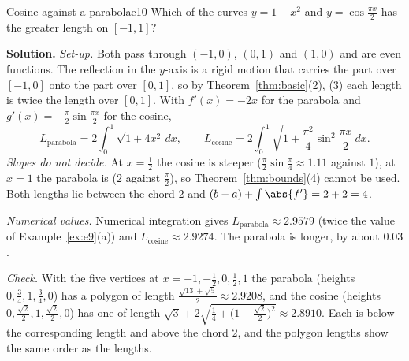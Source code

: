 \documentclass[11pt]{article}
\begin{document}
\begin{exmp}{Cosine against a parabola}{e10}
Which of the curves $y=1-x^2$ and $y=\cos\frac{\pi x}2$ has the greater length on $[-1,1]$?

\textbf{Solution.} \emph{Set-up.} Both pass through $(-1,0)$, $(0,1)$ and $(1,0)$ and are even functions. The reflection in the $y$-axis is a rigid motion that carries the part over $[-1,0]$ onto the part over $[0,1]$, so by Theorem~\ref{thm:basic}(2), (3) each length is twice the length over $[0,1]$. With $f'(x)=-2x$ for the parabola and $g'(x)=-\frac\pi2\sin\frac{\pi x}2$ for the cosine,
\[
L_{\text{parabola}}=2\int_0^1\sqrt{1+4x^2}\,dx,\qquad L_{\text{cosine}}=2\int_0^1\sqrt{1+\frac{\pi^2}4\sin^2\frac{\pi x}2}\,dx .
\]
\emph{Slopes do not decide.} At $x=\frac12$ the cosine is steeper ($\frac\pi2\sin\frac\pi4\approx1.11$ against $1$), at $x=1$ the parabola is ($2$ against $\frac\pi2$), so Theorem~\ref{thm:bounds}(4) cannot be used. Both lengths lie between the chord $2$ and $(b-a)+\int\abs{f'}=2+2=4$.

\emph{Numerical values.} Numerical integration gives $L_{\text{parabola}}\approx2.9579$ (twice the value of Example~\ref{ex:e9}(a)) and $L_{\text{cosine}}\approx2.9274$. The parabola is longer, by about $0.03$.

\emph{Check.} With the five vertices at $x=-1,-\frac12,0,\frac12,1$ the parabola (heights $0,\frac34,1,\frac34,0$) has a polygon of length $\frac{\sqrt{13}+\sqrt5}2\approx2.9208$, and the cosine (heights $0,\frac{\sqrt2}2,1,\frac{\sqrt2}2,0$) has one of length $\sqrt3+2\sqrt{\frac14+\bigl(1-\frac{\sqrt2}2\bigr)^2}\approx2.8910$. Each is below the corresponding length and above the chord $2$, and the polygon lengths show the same order as the lengths.


\end{exmp}
\end{document}
